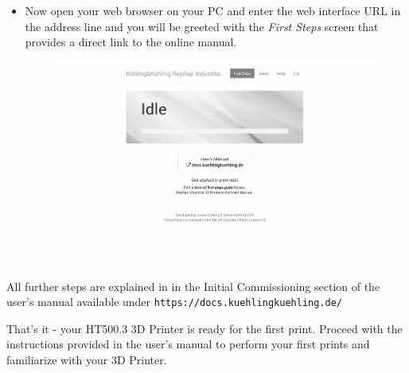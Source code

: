 \begin{itemize}
  \item Now open your web browser on your PC and enter the web interface URL in the 
        address line and you will be greeted with the \emph{First Steps} screen that provides a direct link to the online manual.

    \begin{figure}[H]
      \centering
      \includegraphics[width=.7\linewidth]{./img/qsg_wif_firststeps.png}
    \end{figure}

\end{itemize}

All further steps are explained in in the Initial Commissioning section of the user's manual available 
under \verb|https://docs.kuehlingkuehling.de/|

That's it - your HT500.3 3D Printer is ready for the first print.
Proceed with the instructions provided in the user's manual to perform your first prints and familiarize with your 3D Printer.

